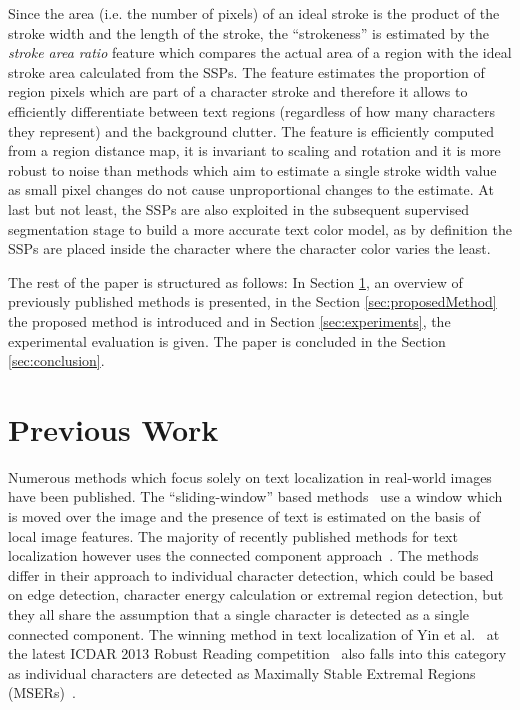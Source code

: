 \documentclass[conference]{IEEEtran}
\begin{document}
Since the area (i.e. the number of pixels) of an ideal stroke is the product of the stroke width and the length of the stroke, the ``strokeness'' is estimated by the \emph{stroke area ratio} feature  which compares the actual area of a region with the ideal stroke area calculated from the SSPs. The feature estimates the proportion of region pixels which are part of a character stroke and therefore it allows to efficiently differentiate between text regions (regardless of how many characters they represent) and the background clutter. The feature is efficiently computed from a region distance map, it is invariant to scaling and rotation and it is more robust to noise than methods which aim to estimate a single stroke width value~\cite{MicrosoftCVPR} as small pixel changes do not cause unproportional changes to the estimate. At last but not least, the SSPs are also exploited in the subsequent supervised segmentation stage to build a more accurate text color model, as by definition the SSPs are placed inside the character where the character color varies the least.


The rest of the paper is structured as follows: In Section \ref{sec:previousWork}, an overview of previously published methods is presented, in the Section \ref{sec:proposedMethod} the proposed method is introduced and in Section \ref{sec:experiments}, the experimental evaluation is given. The paper is concluded in the Section \ref{sec:conclusion}.


\vspace{-5pt}
\section{Previous Work}

\label{sec:previousWork}
Numerous methods which focus solely on text localization in real-world images have been published. The ``sliding-window'' based methods~\cite{Lee-ICDAR2011} use a window which is moved over the image and the presence of text is estimated on the basis of local image features. The majority of recently published methods for text localization however uses the connected component approach~\cite{Neumann-CVPR2012, Neumann-ICDAR2013, MicrosoftCVPR,Yao-CVPR2012,Mishra-CVPR2012,kang2013orientation}. The methods differ in their approach to individual character detection, which could be based on edge detection, character energy calculation or extremal region detection, but they all share the assumption that a single character is detected as a single connected component. The winning method in text localization of Yin et al.~\cite{Yin-TPAMI2013} at the latest ICDAR 2013 Robust Reading competition~\cite{ICDAR2013} also falls into this category as individual characters are detected as Maximally Stable Extremal Regions (MSERs)~\cite{Matas-MSER}.
\end{document}
